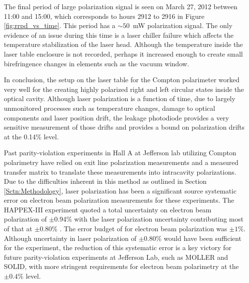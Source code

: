 The final period of large polarization signal is seen on March 27, 2012 between 11:00 and 15:00, which corresponds to hours 2912 to 2916 in Figure \ref{fig:rrpd_vs_time}. This period has a $\sim50$~mW polarization signal. The only evidence of an issue during this time is a laser chiller failure which affects the temperature stabilization of the laser head. Although the temperature inside the laser table enclosure is not recorded, perhaps it increased enough to create small birefringence changes in elements such as the vacuum window. 

In conclusion, the setup on the laser table for the Compton polarimeter worked very well for the creating highly polarized right and left circular states inside the optical cavity. Although laser polarization is a function of time, due to largely unmonitored  processes such as temperature changes, damage to optical components and laser position drift, the leakage photodiode provides a very sensitive measurement of those drifts and provides a bound on polarization drifts at the 0.14\% level. 

Past parity-violation experiments in Hall A at Jefferson lab utilizing Compton polarimetry have relied on exit line polarization measurements and a measured transfer matrix to translate these measurements into intracavity polarizations.  Due to the difficulties inherent in this method as outlined in Section \ref{Sctn:Methodology}, laser polarization has been a significant source systematic error on electron beam polarization measurements for these experiments. The HAPPEX-III experiment quoted a total uncertainty on electron beam polarization of $\pm$0.94\% with the laser polarization uncertainty contributing most of that at $\pm$0.80\% \cite{Friend}. The error budget of \Qs for electron beam polarization was $\pm 1\%$. Although uncertainty in laser polarization of $\pm$0.80\% would have been sufficient for the \Qs experiment, the reduction of this systematic error is a key victory for future parity-violation experiments at Jefferson Lab, such as MOLLER and SOLID, with more stringent requirements for electron beam polarimetry at the $\pm 0.4\%$ level\cite{MOLLER}\cite{SOLID}.

